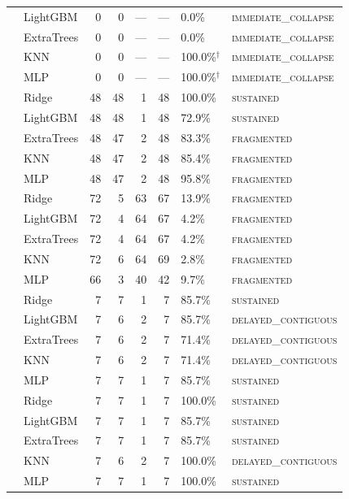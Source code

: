\documentclass[pdflatex,sn-mathphys]{sn-jnl}
\begin{document}
\begin{table}[ht]
\begin{tabularx}{\textwidth}{llrrrrlX}
  & LightGBM   &  0 &  0 & ---& ---&   0.0\%           & \textsc{immediate\_collapse} \\
  & ExtraTrees &  0 &  0 & ---& ---&   0.0\%           & \textsc{immediate\_collapse} \\
  & KNN        &  0 &  0 & ---& ---& 100.0\%$^\dagger$ & \textsc{immediate\_collapse} \\
  & MLP        &  0 &  0 & ---& ---& 100.0\%$^\dagger$ & \textsc{immediate\_collapse} \\
\midrule
{}
  & Ridge        & 48 & 48 &  1 & 48 & 100.0\% & \textsc{sustained} \\
  & LightGBM     & 48 & 48 &  1 & 48 &  72.9\% & \textsc{sustained} \\
  & ExtraTrees   & 48 & 47 &  2 & 48 &  83.3\% & \textsc{fragmented} \\
  & KNN          & 48 & 47 &  2 & 48 &  85.4\% & \textsc{fragmented} \\
  & MLP          & 48 & 47 &  2 & 48 &  95.8\% & \textsc{fragmented} \\
\midrule
{}
  & Ridge        & 72 &  5 & 63 & 67 &  13.9\% & \textsc{fragmented} \\
  & LightGBM     & 72 &  4 & 64 & 67 &   4.2\% & \textsc{fragmented} \\
  & ExtraTrees   & 72 &  4 & 64 & 67 &   4.2\% & \textsc{fragmented} \\
  & KNN          & 72 &  6 & 64 & 69 &   2.8\% & \textsc{fragmented} \\
  & MLP          & 66 &  3 & 40 & 42 &   9.7\% & \textsc{fragmented} \\
\midrule
{}
  & Ridge      & 7 & 7 & 1 & 7 &  85.7\% & \textsc{sustained} \\
  & LightGBM   & 7 & 6 & 2 & 7 &  85.7\% & \textsc{delayed\_contiguous} \\
  & ExtraTrees & 7 & 6 & 2 & 7 &  71.4\% & \textsc{delayed\_contiguous} \\
  & KNN        & 7 & 6 & 2 & 7 &  71.4\% & \textsc{delayed\_contiguous} \\
  & MLP        & 7 & 7 & 1 & 7 &  85.7\% & \textsc{sustained} \\
\midrule
{}
  & Ridge      & 7 & 7 & 1 & 7 & 100.0\% & \textsc{sustained} \\
  & LightGBM   & 7 & 7 & 1 & 7 &  85.7\% & \textsc{sustained} \\
  & ExtraTrees & 7 & 7 & 1 & 7 &  85.7\% & \textsc{sustained} \\
  & KNN        & 7 & 6 & 2 & 7 & 100.0\% & \textsc{delayed\_contiguous} \\
  & MLP        & 7 & 7 & 1 & 7 & 100.0\% & \textsc{sustained} \\
\bottomrule
\end{tabularx}
\end{table}
\end{document}
